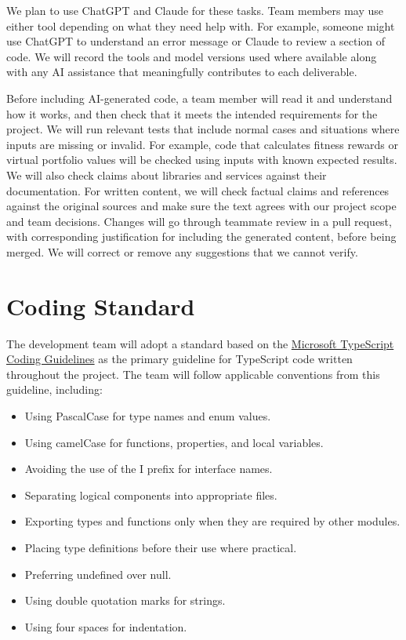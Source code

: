 \documentclass{article}
\begin{document}
We plan to use ChatGPT and Claude for these tasks. Team members may use either tool depending on what they need help with. For example, someone might use ChatGPT to understand an error message or Claude to review a section of code. We will record the tools and model versions used where available along with any AI assistance that meaningfully contributes to each deliverable. 

Before including AI-generated code, a team member will read it and understand how it works, and then check that it meets the intended requirements for the project. We will run relevant tests that include normal cases and situations where inputs are missing or invalid. For example, code that calculates fitness rewards or virtual portfolio values will be checked using inputs with known expected results. We will also check claims about libraries and services against their documentation. For written content, we will check factual claims and references against the original sources and make sure the text agrees with our project scope and team decisions. Changes will go through teammate review in a pull request, with corresponding justification for including the generated content, before being merged. We will correct or remove any suggestions that we cannot verify. 


\section{Coding Standard} \label{SecCodingStandard}

The development team will adopt a standard based on the \href{https://github.com/microsoft/TypeScript/wiki/Coding-guidelines}{Microsoft TypeScript Coding Guidelines} as the primary guideline for TypeScript code written throughout the project. The team will follow applicable conventions from this guideline, including:


\begin{itemize}
    \item Using PascalCase for type names and enum values.
    \item Using camelCase for functions, properties, and local variables.
    \item Avoiding the use of the I prefix for interface names.
    \item Separating logical components into appropriate files.
    \item Exporting types and functions only when they are required by other modules.
    \item Placing type definitions before their use where practical.
    \item Preferring undefined over null.
    \item Using double quotation marks for strings.
    \item Using four spaces for indentation.
\end{itemize}
\end{document}
